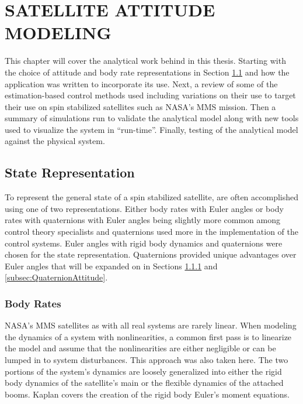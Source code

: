
\chapter{SATELLITE ATTITUDE MODELING}
\label{chap:SatelliteAttitudeModeling}

This chapter will cover the analytical work behind in this thesis.  Starting with the choice of attitude and body rate representations in Section \ref{sec:StateRepresentation} and how the application was written to incorporate its use.  Next, a review of some of the estimation-based control methods used including variations on their use to target their use on spin stabilized satellites such as NASA's MMS mission.  Then a summary of simulations run to validate the analytical model along with new tools used to visualize the system in ``run-time''.  Finally, testing of the analytical model against the physical system.

\section{State Representation}
\label{sec:StateRepresentation}

To represent the general state of a spin stabilized satellite, are often accomplished using one of two representations.  Either body rates with Euler angles or body rates with quaternions with Euler angles being slightly more common among control theory specialists and quaternions used more in the implementation of the control systems.  Euler angles with rigid body dynamics and quaternions were chosen for the state representation.  Quaternions provided unique advantages over Euler angles that will be expanded on in Sections \ref{subsec:BodyRate} and \ref{subsec:QuaternionAttitude}.

\subsection{Body Rates}
\label{subsec:BodyRate}

NASA's MMS satellites as with all real systems are rarely linear.  When modeling the dynamics of a system with nonlinearities, a common first pass is to linearize the model and assume that the nonlinearities are either negligible or can be lumped in to system disturbances.  This approach was also taken here.  The two portions of the system's dynamics are loosely generalized into either the rigid body dynamics of the satellite's main or the flexible dynamics of the attached booms.  Kaplan \cite{kaplan} covers the creation of the rigid body Euler's moment equations.

